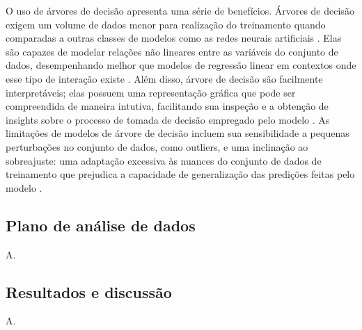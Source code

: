 O uso de árvores de decisão apresenta uma série de benefícios. Árvores de decisão exigem um volume de dados menor para realização do treinamento quando comparadas a outras classes
de modelos como as redes neurais artificiais \cite{Theobald2021}. Elas são capazes de modelar relações não lineares entre as variáveis do conjunto de dados, desempenhando melhor
que modelos de regressão linear em contextos onde esse tipo de interação existe \cite{Bi2019}. Além disso, árvore de decisão são facilmente interpretáveis; elas possuem uma representação
gráfica que pode ser compreendida de maneira intutiva, facilitando sua inspeção e a obtenção de insights sobre o processo de tomada de decisão empregado pelo modelo \cite{Bi2019}.
As limitações de modelos de árvore de decisão incluem sua sensibilidade a pequenas perturbações no conjunto de dados, como outliers, e uma inclinação ao sobreajuste: uma adaptação
excessiva às nuances do conjunto de dados de treinamento que prejudica a capacidade de generalização das predições feitas pelo modelo \cite{Bi2019}.

\subsection{Plano de análise de dados}

A.

\subsection{Resultados e discussão}

A.
